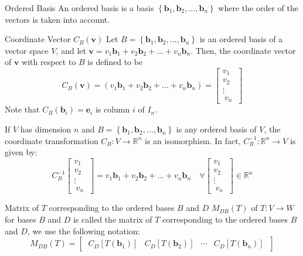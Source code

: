 \documentclass[12pt]{article}
\begin{document}
\begin{definition}{Ordered Basis}{}
    An ordered basis is a basis $ \left\{ \mathbf{b}_1, \mathbf{b}_2, \dots, \mathbf{b}_n \right\} $ where the order of the vectors is taken into account.
\end{definition}

\begin{definition}{Coordinate Vector $ C_B \left( \mathbf{v} \right) $}{}
    Let $ B = \left\{ \mathbf{b}_1, \mathbf{b}_2, \dots, \mathbf{b}_n \right\} $ is an ordered basis of a vector space $ V $, and let $ \mathbf{v} = v_1 \mathbf{b}_1 + v_2 \mathbf{b}_2 + \dots + v_n \mathbf{b}_n $. Then, the coordinate vector of $ \mathbf{v} $ with respect to $ B $ is defined to be
    \[ C_B \left( \mathbf{v} \right) = \left( v_1 \mathbf{b}_1 + v_2 \mathbf{b}_2 + \dots + v_n \mathbf{b}_n \right) = \begin{bmatrix} v_1 \\ v_2 \\ \vdots \\ \ v_n \ \end{bmatrix} \]
    Note that $ C_B \left( \mathbf{b}_i \right) = \mathbf{e}_i $ is column $ i $ of $ I_n $.
\end{definition}

\begin{theorem}{}{}
    If $ V $ has dimension $ n $ and $ B = \left\{ \mathbf{b}_1, \mathbf{b}_2, \dots, \mathbf{b}_n \right\} $ is any ordered basis of $ V $, the coordinate transformation $ C_B : V \to \mathbb{R}^n $ is an isomorphism. In fact, $ C^{-1}_B : \mathbb{R}^n \to V $ is given by:
    \[ C^{-1}_B \begin{bmatrix} v_1 \\ v_2 \\ \vdots \\ \ v_n \ \end{bmatrix} = v_1 \mathbf{b}_1 + v_2 \mathbf{b}_2 + \dots + v_n \mathbf{b}_n \quad \forall \begin{bmatrix} v_1 \\ v_2 \\ \vdots \\ \ v_n \ \end{bmatrix} \in \mathbb{R}^n \]
\end{theorem}

\begin{definition}{Matrix of $ T $ corresponding to the ordered bases $ B $ and $ D $}{}
    $ M_{DB} \left( T \right) $ of $ T : V \to W $ for bases $ B $ and $ D $ is called the matrix of $ T $ corresponding to the ordered bases $ B $ and $ D $, we use the following notation:
    \[ M_{DB} \left( T \right) = \begin{bmatrix} \ C_D \left[ T \left( \mathbf{b}_1 \right) \right] & C_D \left[ T \left( \mathbf{b}_2 \right) \right] & \cdots & C_D \left[ T \left( \mathbf{b}_n \right) \right] \ \end{bmatrix} \]
\end{definition}
\end{document}
